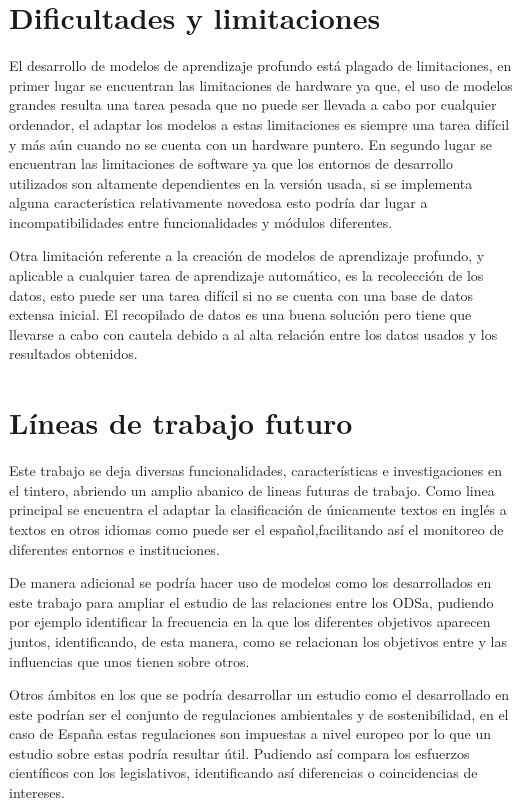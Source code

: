 \section{Dificultades y limitaciones}
El desarrollo de modelos de aprendizaje profundo está plagado de limitaciones, en primer lugar se encuentran las limitaciones de hardware ya que, el uso de modelos grandes resulta una tarea pesada que no puede ser llevada a cabo por cualquier ordenador, el adaptar los modelos a estas limitaciones es siempre una tarea difícil y más aún cuando no se cuenta con un hardware puntero. En segundo lugar se encuentran las limitaciones de software ya que los entornos de desarrollo utilizados son altamente dependientes en la versión usada, si se implementa alguna característica relativamente novedosa esto podría dar lugar a incompatibilidades entre funcionalidades y módulos diferentes. 

Otra limitación referente a la creación de modelos de aprendizaje profundo, y aplicable a cualquier tarea de aprendizaje automático, es la recolección de los datos, esto puede ser una tarea difícil si no se cuenta con una base de datos extensa inicial. El recopilado de datos es una buena solución pero tiene que llevarse a cabo con cautela debido a al alta relación entre los datos usados y los resultados obtenidos. 

\section{Líneas de trabajo futuro}
Este trabajo se deja diversas funcionalidades, características e investigaciones en el tintero, abriendo un amplio abanico de lineas futuras de trabajo. Como linea principal se encuentra el adaptar la clasificación de únicamente textos en inglés a textos en otros idiomas como puede ser el español,facilitando así el monitoreo de diferentes entornos e instituciones. 

De manera adicional se podría hacer uso de modelos como los desarrollados en este trabajo para ampliar el estudio de  las relaciones entre los \gls{ODSa}, pudiendo por ejemplo identificar la frecuencia en la que los diferentes objetivos aparecen juntos, identificando, de esta manera, como se relacionan los objetivos entre y las influencias que unos tienen sobre otros.

Otros ámbitos en los que se podría desarrollar un estudio como el desarrollado en este podrían ser el conjunto de regulaciones ambientales y de sostenibilidad, en el caso de España estas regulaciones son impuestas a nivel europeo por lo que un estudio sobre estas podría resultar útil. Pudiendo así compara los esfuerzos científicos con los legislativos, identificando así diferencias o coincidencias de intereses. 